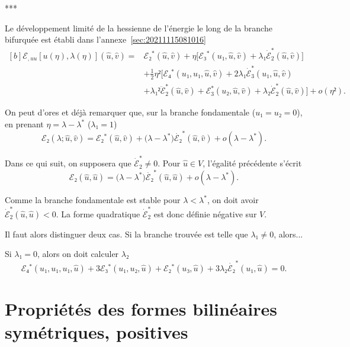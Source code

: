 \documentclass[12pt, final]{amsart}
\begin{document}
\begin{center}
  ***
\end{center}

Le développement limité de la hessienne de l'énergie le long de la branche
bifurquée est établi dans l'annexe~\ref{sec:20211115081016}
\begin{equation}
  \label{eq:20211115082025}
  \begin{aligned}[b]
    ℰ_{,uu}[u(η), λ(η)](\hat{u}, \hat{v})
    ={}&ℰ₂^*(\hat{u}, \hat{v})+η\bigl[ℰ₃^*(u₁, \hat{u}, \hat{v})
    +λ₁\dot{ℰ}_2^*(\hat{u}, \hat{v})\bigr]\\
    &+\tfrac12η²\bigl[ℰ₄^*(u₁, u₁, \hat{u}, \hat{v})
    +2λ₁\dot{ℰ}_3^*(u₁, \hat{u}, \hat{v})\\
    &+λ₁²\ddot{ℰ}_2^*(\hat{u}, \hat{v})+ℰ_3^*(u₂, \hat{u}, \hat{v})
    +λ₂\dot{ℰ}_2^*(\hat{u}, \hat{v})\bigr]+o(η²).
  \end{aligned}
\end{equation}

On peut d'ores et déjà remarquer que, sur la branche fondamentale
(\(u₁=u₂=0\)), en prenant \(η=λ-λ^*\) (\(λ₁=1\))
\begin{equation}
  ℰ₂(λ; \hat{u}, \hat{v})
  =ℰ₂^*(\hat{u}, \hat{v})+\bigl(λ-λ^*\bigr)\dot{ℰ₂}^*(\hat{u}, \hat{v})+o(λ-λ^*).
\end{equation}

Dans ce qui suit, on supposera que \(\dot{ℰ}_2^*≠0\). Pour \(\hat{u}∈V\),
l'égalité précédente s'écrit
\begin{equation}
  ℰ₂(\hat{u}, \hat{u})=\bigl(λ-λ^*\bigr)\dot{ℰ₂}^*(\hat{u}, \hat{u})+o(λ-λ^*).
\end{equation}

Comme la branche fondamentale est stable pour \(λ<λ^*\), on doit avoir
\(\dot{ℰ}_2^*(\hat{u}, \hat{u})<0\). La forme quadratique \(\dot{ℰ}_2^*\) est
donc définie négative sur \(V\).

Il faut alors distinguer deux cas. Si la branche trouvée est telle que
\(λ₁≠0\), alors...

Si \(λ₁=0\), alors on doit calculer \(λ₂\)
\begin{equation}
  ℰ₄^*(u₁, u₁, u₁, \hat{u})+3ℰ₃^*(u₁, u₂, \hat{u})+ℰ₂^*(u₃, \hat{u})
  +3λ₂\dot{ℰ₂}^*(u₁, \hat{u})=0.
\end{equation}

\appendix

\section{Propriétés des formes bilinéaires symétriques, positives}
\end{document}
